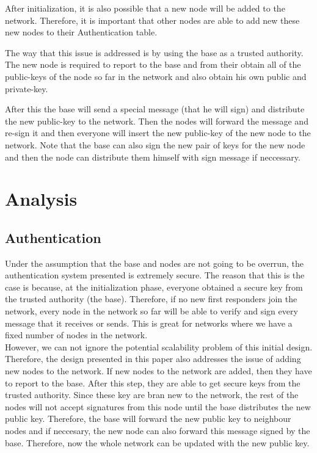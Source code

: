 \documentclass[letterpaper]{article}
\begin{document}
After initialization, it is also possible that a new node will be added to the network. 
Therefore, it is important that other nodes are able to add new these new nodes to their Authentication table.

The way that this issue is addressed is by using the base as a trusted authority.
The new node is required to report to the base and from their obtain all of the public-keys of the node so far in the network and also obtain his own public and private-key. 

After this the base will send a special message (that he will sign) and distribute the new public-key to the network. 
Then the nodes will forward the message and re-sign it and then everyone will insert the new public-key of the new node to the network. Note that the base can also sign the new pair of keys for the new node and then the node can distribute them himself with sign message if neccessary.

\section{Analysis}

\subsection{Authentication}
Under the assumption that the base and nodes are not going to be overrun, the authentication system presented is extremely secure. The reason that this is the case is because, at the initialization phase, everyone obtained a secure key from the trusted authority (the base). Therefore, if no new first responders join the network, every node in the network so far will be able to verify and sign every message that it receives or sends. This is great for networks where we have a fixed number of nodes in the network. \\

However, we can not ignore the potential scalability problem of this initial design. Therefore, the design presented in this paper also addresses the issue of adding new nodes to the network. If new nodes to the network are added, then they have to report to the base. After this step, they are able to get secure keys from the trusted authority. Since these key are bran new to the network, the rest of the nodes will not accept signatures from this node until the base distributes the new public key. Therefore, the base will forward the new public key to neighbour nodes and if neccesary, the new node can also forward this message signed by the base. Therefore, now the whole network can be updated with the new public key. \\
\end{document}
